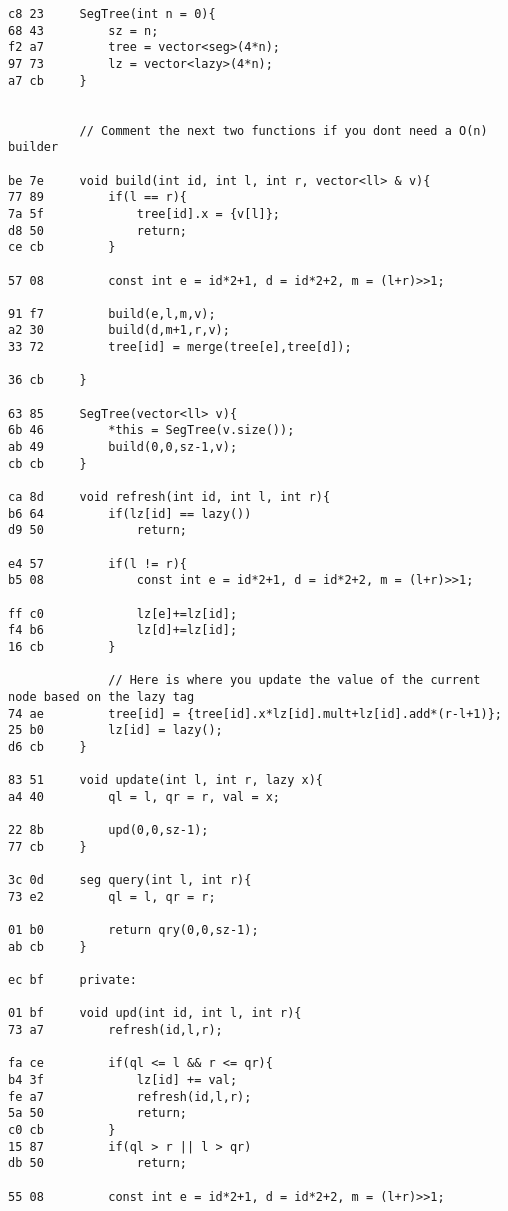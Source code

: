 \documentclass[11pt, a4paper, twoside]{article}
\begin{document}
\begin{lstlisting}
c8 23     SegTree(int n = 0){
68 43         sz = n;
f2 a7         tree = vector<seg>(4*n);
97 73         lz = vector<lazy>(4*n);
a7 cb     }
          
          
          // Comment the next two functions if you dont need a O(n) builder
      
be 7e     void build(int id, int l, int r, vector<ll> & v){
77 89         if(l == r){
7a 5f             tree[id].x = {v[l]};
d8 50             return;
ce cb         }
      
57 08         const int e = id*2+1, d = id*2+2, m = (l+r)>>1;
      
91 f7         build(e,l,m,v);
a2 30         build(d,m+1,r,v);
33 72         tree[id] = merge(tree[e],tree[d]);
      
36 cb     }
      
63 85     SegTree(vector<ll> v){
6b 46         *this = SegTree(v.size());
ab 49         build(0,0,sz-1,v);
cb cb     }
      
ca 8d     void refresh(int id, int l, int r){
b6 64         if(lz[id] == lazy())
d9 50             return;
              
e4 57         if(l != r){
b5 08             const int e = id*2+1, d = id*2+2, m = (l+r)>>1;
      
ff c0             lz[e]+=lz[id];
f4 b6             lz[d]+=lz[id];
16 cb         }
      
              // Here is where you update the value of the current node based on the lazy tag
74 ae         tree[id] = {tree[id].x*lz[id].mult+lz[id].add*(r-l+1)};
25 b0         lz[id] = lazy();
d6 cb     }
      
83 51     void update(int l, int r, lazy x){
a4 40         ql = l, qr = r, val = x;
      
22 8b         upd(0,0,sz-1);
77 cb     }
      
3c 0d     seg query(int l, int r){
73 e2         ql = l, qr = r;
      
01 b0         return qry(0,0,sz-1);
ab cb     }
      
ec bf     private:
          
01 bf     void upd(int id, int l, int r){
73 a7         refresh(id,l,r);
      
fa ce         if(ql <= l && r <= qr){
b4 3f             lz[id] += val;
fe a7             refresh(id,l,r);
5a 50             return;
c0 cb         }
15 87         if(ql > r || l > qr)
db 50             return;
      
55 08         const int e = id*2+1, d = id*2+2, m = (l+r)>>1;
      

\end{lstlisting}
\end{document}
